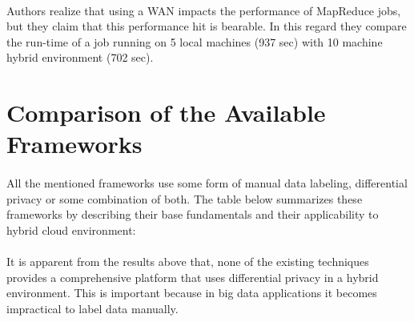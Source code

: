 \documentclass{report}
\begin{document}
\paragraph{}
Authors realize that using a WAN impacts the performance of MapReduce jobs, but they claim that this performance hit is bearable. In this regard they compare the run-time of a job running on 5 local machines (937 sec) with 10 machine hybrid environment (702 sec).

\section{Comparison of the Available Frameworks}
\paragraph{}
All the mentioned frameworks use some form of manual data labeling, differential privacy or some combination of both. The table below summarizes these frameworks by describing their base fundamentals and their applicability to hybrid cloud environment:


\begin{table}[h]
\centering
\caption{Frameworks for privacy Oriented Analysis}
\label{Frameworks for privacy Oriented Analysis}
\end{table}
\paragraph{}
It is apparent from the results above that, none of the existing techniques provides a comprehensive platform that uses differential privacy in a hybrid environment. This is important because in big data applications it becomes impractical to label data manually.
\end{document}
